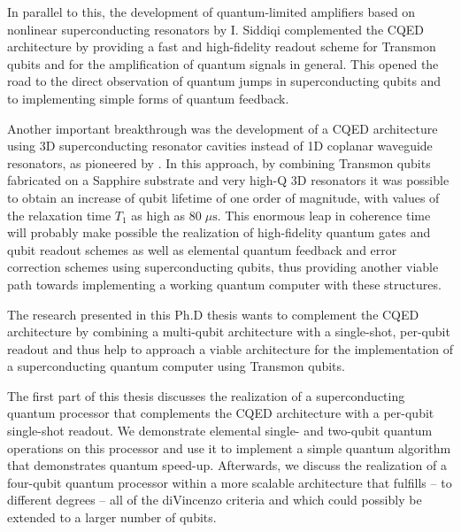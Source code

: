 
In parallel to this, the development of quantum-limited amplifiers based on nonlinear superconducting resonators by I. Siddiqi \citep{siddiqi_rf-driven_2004} complemented the CQED architecture by providing a fast and high-fidelity readout scheme for Transmon qubits \citep{siddiqi_dispersive_2006,mallet_single-shot_2009} and for the amplification of quantum signals in general. This opened the road to the direct observation of quantum jumps in superconducting qubits \citep{vijay_observation_2011} and to implementing simple forms of quantum feedback.

Another important breakthrough was the development of a CQED architecture using 3D superconducting resonator cavities instead of 1D coplanar waveguide resonators, as pioneered by \cite{paik_observation_2011}. In this approach, by combining Transmon qubits fabricated on a Sapphire substrate and very high-Q 3D resonators it was possible to obtain an increase of qubit lifetime of one order of magnitude, with values of the relaxation time $T_1$ as high as $80 \; \mu \mathrm{s}$. This enormous leap in coherence time will probably make possible the realization of high-fidelity quantum gates and qubit readout schemes as well as elemental quantum feedback and error correction schemes using superconducting qubits, thus providing another viable path towards implementing a working quantum computer with these structures.

The research presented in this Ph.D thesis wants to complement the CQED architecture by combining a multi-qubit architecture with a single-shot, per-qubit readout and thus help to approach a viable architecture for the implementation of a superconducting quantum computer using Transmon qubits. 

The first part of this thesis discusses the realization of a superconducting quantum processor that complements the CQED architecture with a per-qubit single-shot readout. We demonstrate elemental single- and two-qubit quantum operations on this processor and use it to implement a simple quantum algorithm that demonstrates quantum speed-up. Afterwards, we discuss the realization of a four-qubit quantum processor within a more scalable architecture that fulfills -- to different degrees -- all of the diVincenzo criteria and which could possibly be extended to a larger number of qubits.

